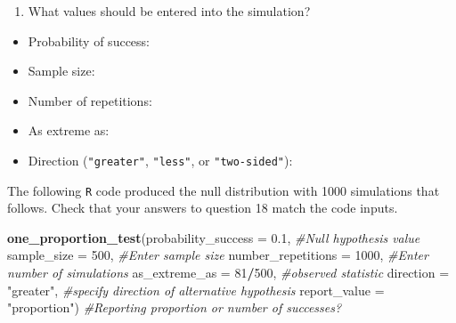 \documentclass[
]{report}
\newenvironment{Shaded}{\begin{snugshade}}{\end{snugshade}}
\newcommand{\CommentTok}[1]{\textcolor[rgb]{0.56,0.35,0.01}{\textit{#1}}}
\newcommand{\DataTypeTok}[1]{\textcolor[rgb]{0.13,0.29,0.53}{#1}}
\newcommand{\DecValTok}[1]{\textcolor[rgb]{0.00,0.00,0.81}{#1}}
\newcommand{\FloatTok}[1]{\textcolor[rgb]{0.00,0.00,0.81}{#1}}
\newcommand{\KeywordTok}[1]{\textcolor[rgb]{0.13,0.29,0.53}{\textbf{#1}}}
\newcommand{\NormalTok}[1]{#1}
\newcommand{\OperatorTok}[1]{\textcolor[rgb]{0.81,0.36,0.00}{\textbf{#1}}}
\newcommand{\StringTok}[1]{\textcolor[rgb]{0.31,0.60,0.02}{#1}}
\providecommand{\tightlist}{%
  \setlength{\itemsep}{0pt}\setlength{\parskip}{0pt}}
\begin{document}
\begin{enumerate}
\def\labelenumi{\arabic{enumi}.}
\setcounter{enumi}{17}
\tightlist
\item
  What values should be entered into the simulation?
\end{enumerate}

\vspace{.2in}

\begin{itemize}
\tightlist
\item
  Probability of success:
\end{itemize}

\vspace{.2in}

\begin{itemize}
\tightlist
\item
  Sample size:
\end{itemize}

\vspace{.2in}

\begin{itemize}
\tightlist
\item
  Number of repetitions:
\end{itemize}

\vspace{.2in}

\begin{itemize}
\tightlist
\item
  As extreme as:
\end{itemize}

\vspace{.2in}

\begin{itemize}
\tightlist
\item
  Direction (\texttt{"greater"}, \texttt{"less"}, or \texttt{"two-sided"}):
\end{itemize}

\vspace{.2in}

The following \texttt{R} code produced the null distribution with 1000 simulations that follows. Check that your answers to question 18 match the code inputs.

\begin{Shaded}
\begin{Highlighting}[]
\KeywordTok{one\_proportion\_test}\NormalTok{(}\DataTypeTok{probability\_success =} \FloatTok{0.1}\NormalTok{, }\CommentTok{\#Null hypothesis value}
                    \DataTypeTok{sample\_size =} \DecValTok{500}\NormalTok{, }\CommentTok{\#Enter sample size}
                    \DataTypeTok{number\_repetitions =} \DecValTok{1000}\NormalTok{, }\CommentTok{\#Enter number of simulations}
                    \DataTypeTok{as\_extreme\_as =} \DecValTok{81}\OperatorTok{/}\DecValTok{500}\NormalTok{, }\CommentTok{\#observed statistic}
                    \DataTypeTok{direction =} \StringTok{"greater"}\NormalTok{, }\CommentTok{\#specify direction of alternative hypothesis}
                    \DataTypeTok{report\_value =} \StringTok{"proportion"}\NormalTok{) }\CommentTok{\#Reporting proportion or number of successes?}
\end{Highlighting}
\end{Shaded}
\end{document}
